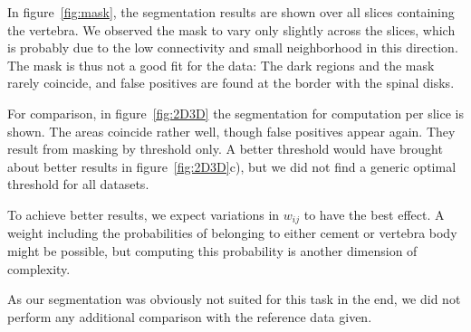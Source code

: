 \documentclass{article}
\begin{document}
  In figure~\ref{fig:mask}, the segmentation results are shown over all slices containing the vertebra.
  We observed the mask to vary only slightly across the slices, which is probably due to the low connectivity and small neighborhood in this direction.
  The mask is thus not a good fit for the data:
  The dark regions and the mask rarely coincide, and false positives are found at the border with the spinal disks.
  
  For comparison, in figure~\ref{fig:2D3D} the segmentation for computation per slice is shown. The areas coincide rather well, though false positives appear again.
  They result from masking by threshold only.
  A better threshold would have brought about better results in figure~\ref{fig:2D3D}c), but we did not find a generic optimal threshold for all datasets.
  
  To achieve better results, we expect variations in $w_{ij}$ to have the best effect.
  A weight including the probabilities of belonging to either cement or vertebra body might be possible, but computing this probability is another dimension of complexity.
    
  As our segmentation was obviously not suited for this task in the end, we did not perform any additional comparison with the reference data given.
  
\end{document}
